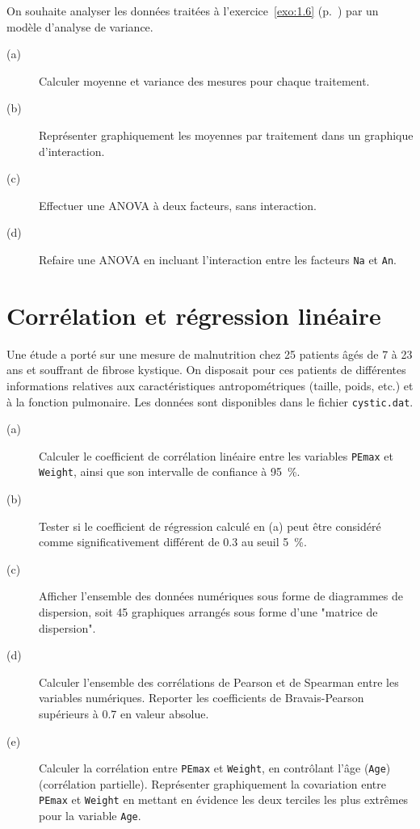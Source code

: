 \begin{exo}\label{exo:4.4}
On souhaite analyser les données traitées à l'exercice~\ref{exo:1.6}
(p.~\pageref{exo:1.6}) par un modèle d'analyse de variance.

\begin{description}
\item[(a)] Calculer moyenne et variance des mesures pour chaque traitement.
\item[(b)] Représenter graphiquement les moyennes par traitement dans un
  graphique d'interaction.
\item[(c)] Effectuer une ANOVA à deux facteurs, sans interaction.
\item[(d)] Refaire une ANOVA en incluant l'interaction entre les facteurs
  \texttt{Na} et \texttt{An}.
\end{description}

\end{exo}

\chapter{Corrélation et régression linéaire}\label{chap:reg}

\begin{exo}\label{exo:5.1}
Une étude a porté sur une mesure de malnutrition chez 25 patients âgés de 7
à 23 ans et souffrant de fibrose kystique. On disposait pour ces patients de
différentes informations relatives aux caractéristiques antropométriques
(taille, poids, etc.) et à la fonction pulmonaire. \autocite[p.~180]{everitt01}
Les données sont disponibles dans le fichier \texttt{cystic.dat}.
\begin{description}
\item[(a)] Calculer le coefficient de corrélation linéaire entre les
  variables \texttt{PEmax} et \texttt{Weight}, ainsi que son intervalle de
  confiance à 95~\%.
\item[(b)] Tester si le coefficient de régression calculé en (a) peut être
  considéré comme significativement différent de 0.3 au seuil 5~\%.
\item[(c)] Afficher l'ensemble des données numériques sous forme de
  diagrammes de dispersion, soit 45 graphiques arrangés sous forme d'une
  "matrice de dispersion".
\item[(d)] Calculer l'ensemble des corrélations de Pearson et de Spearman
  entre les variables numériques. Reporter les coefficients de
  Bravais-Pearson supérieurs à 0.7 en valeur absolue.
\item[(e)] Calculer la corrélation entre \texttt{PEmax} et \texttt{Weight},
  en contrôlant l'âge (\texttt{Age}) (corrélation partielle). Représenter
  graphiquement la covariation entre \texttt{PEmax} et \texttt{Weight} en
  mettant en évidence les deux terciles les plus extrêmes pour la variable
  \texttt{Age}. 
\end{description}
\end{exo}

